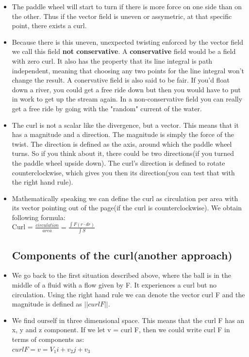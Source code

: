 \documentclass[12pt,a4paper]{article}
\begin{document}
\begin{itemize}
		\item The paddle wheel will start to turn if there is more force on one side than on the other. Thus if the vector field is uneven or assymetric, at that specific point, there exists a curl. 
		\item Because there is this uneven, unexpected twisting enforced by the vector field we call this field \textbf{not conservative}. A \textbf{conservative} field would be a field with zero curl. It also has the property that its line integral is path independent, meaning that choosing any two points for the line integral won't change the result. A conervative field is also said to be fair. If you'd float down a river, you could get a free ride down but then you would have to put in work to get up the stream again. In a non-conservative field you can really get a free ride by going with the "random" current of the water. 
		\item The curl is not a scalar like the divergence, but a vector. This means that it has a magnitude and a direction. The magnitude is simply the force of the twist. The direction is defined as the axis, around which the paddle wheel turns. So if you think about it, there could be two directions(if you turned the paddle wheel upside down). The curl's direction is defined to rotate counterclockwise, which gives you then its direction(you can test that with the right hand rule).
		
		\item Mathematically speaking we can define the curl as circulation per area with its vector pointing out of the page(if the curl is counterclockwise). We obtain following formula:\\
		Curl = $\frac{circulation}{area} = \frac{\int F(r \cdot dr)}{\int S}$
		
		\subsection{Components of the curl(another approach)}
		
		\item We go back to the first situation described above, where the ball is in the middle of a fluid with a flow given by F. It experiences a curl but no circulation. Using the right hand rule we can denote the vector curl F and the magnitude is defined as $||curl F ||$.
		
		\item We find ourself in three dimensional space. This means that the curl F has an x, y and z component. If we let v = curl F, then we could write curl F in terms of components as:\\
		$curl F = v = V_1i + v_2j + v_3$
		

\end{itemize}
\end{document}
